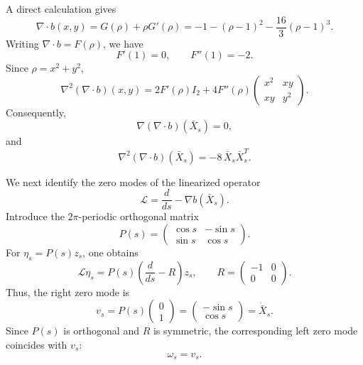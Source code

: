 \documentclass[preprint,12pt]{elsarticle}
\theoremstyle{definition}
\theoremstyle{plain}
\begin{document}
A direct calculation gives
\begin{equation*}
    \nabla\cdot b(x,y)
    =
    G(\rho)+\rho G'(\rho)
    =
    -1-(\rho-1)^2-\frac{16}{3}(\rho-1)^3.
\end{equation*}
Writing $\nabla\cdot b=F(\rho)$, we have
\begin{equation*}
    F'(1)=0,
    \qquad
    F''(1)=-2.
\end{equation*}
Since $\rho=x^2+y^2$,
\begin{equation*}
    \nabla^2(\nabla\cdot b)(x,y)
    =
    2F'(\rho)I_2
    +
    4F''(\rho)
    \begin{pmatrix}
        x^2 & xy\\
        xy & y^2
    \end{pmatrix}.
\end{equation*}
Consequently,
\begin{equation*}
    \nabla(\nabla\cdot b)(\bar X_s)=0,
\end{equation*}
and
\begin{equation}
\label{eq:hessian-divergence-along-orbit}
    \nabla^2(\nabla\cdot b)(\bar X_s)
    =
    -8\,\bar X_s\bar X_s^T.
\end{equation}

We next identify the zero modes of the linearized operator
\begin{equation*}
    \mathcal L
    =
    \frac{d}{ds}-\nabla b(\bar X_s).
\end{equation*}
Introduce the $2\pi$-periodic orthogonal matrix
\begin{equation*}
    P(s)
    =
    \begin{pmatrix}
        \cos s & -\sin s\\
        \sin s & \cos s
    \end{pmatrix}.
\end{equation*}
For $\eta_s=P(s)z_s$, one obtains
\begin{equation*}
    \mathcal L\eta_s
    =
    P(s)
    \left(
        \frac{d}{ds}-R
    \right)z_s,
    \qquad
    R
    =
    \begin{pmatrix}
        -1 & 0\\
        0 & 0
    \end{pmatrix}.
\end{equation*}
Thus, the right zero mode is
\begin{equation*}
    v_s
    =
    P(s)
    \begin{pmatrix}
        0\\
        1
    \end{pmatrix}
    =
    \begin{pmatrix}
        -\sin s\\
        \cos s
    \end{pmatrix}
    =
    \dot{\bar X}_s.
\end{equation*}
Since $P(s)$ is orthogonal and $R$ is symmetric, the corresponding left zero
mode coincides with $v_s$:
\begin{equation*}
    \omega_s=v_s.
\end{equation*}
\end{document}

